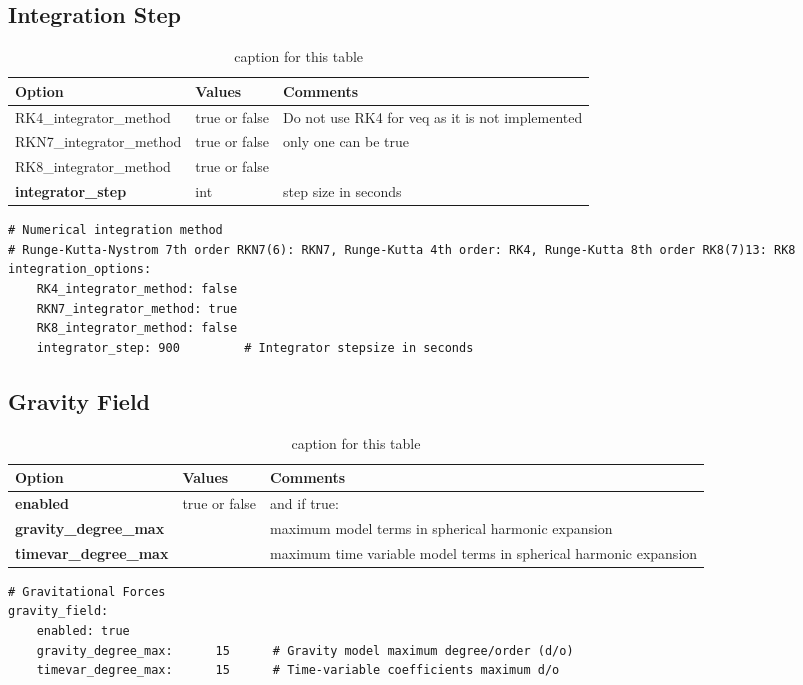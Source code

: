 \subsection{Integration Step}
\begin{table}[h!]
	\begin{tabular}{|p{4.5cm}|p{2cm}|p{3.5cm}|}
		\hline
		Option & Values & Comments \\
		\hline
		RK4\_integrator\_method & true or false &  Do not use RK4 for veq as it is not implemented\\ 
		RKN7\_integrator\_method & true or false & only one can be true\\ 
		RK8\_integrator\_method  & true or false & \\
		\hline
		\textbf{integrator\_step} & int & step size in seconds \\
		\hline
	\end{tabular}
	\caption{caption for this table}
	\label{table:label_name}
\end{table}
%
{\small
	\begin{lstlisting}[language=xml,caption=yaml example for gravitational force model options]
# Numerical integration method
# Runge-Kutta-Nystrom 7th order RKN7(6): RKN7, Runge-Kutta 4th order: RK4, Runge-Kutta 8th order RK8(7)13: RK8
integration_options:
	RK4_integrator_method: false
	RKN7_integrator_method: true
	RK8_integrator_method: false
	integrator_step: 900         # Integrator stepsize in seconds	
	\end{lstlisting}
	}

\subsection{Gravity Field}
\begin{table}[h!]
	\begin{tabular}{|p{4.5cm}|p{2cm}|p{3.5cm}|}
		\hline
		Option & Values & Comments \\
		\hline
		\textbf{enabled} & true or false & and if true:\\
		\textbf{gravity\_degree\_max} &  & maximum model terms in spherical harmonic expansion \\ 
		\textbf{timevar\_degree\_max} &  & maximum time variable model terms in spherical harmonic expansion \\
		\hline
	\end{tabular}
	\caption{caption for this table}
	\label{table:label_name}
\end{table}
%
{\small
	\begin{lstlisting}[language=xml,caption=yaml example for gravitational force model options]
# Gravitational Forces
gravity_field:
	enabled: true
	gravity_degree_max:      15      # Gravity model maximum degree/order (d/o)
	timevar_degree_max:      15      # Time-variable coefficients maximum d/o
	\end{lstlisting}
}
%
